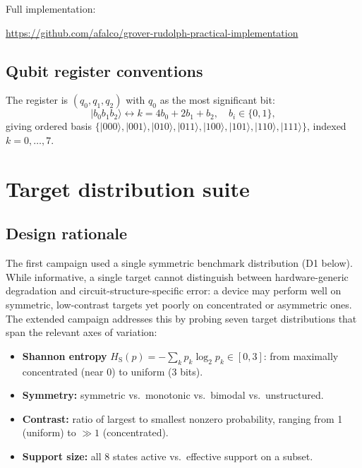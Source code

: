 \documentclass[11pt,a4paper]{article}
\renewcommand{\ket}[1]{|#1\rangle}
\newcommand{\HS}{H_{\mathrm{S}}}
\begin{document}
\noindent Full implementation:
\begin{center}
  \url{https://github.com/afalco/grover-rudolph-practical-implementation}
\end{center}

\subsection{Qubit register conventions}

The register is $(q_0, q_1, q_2)$ with $q_0$ as the most significant
bit:
\[
  \ket{b_0 b_1 b_2} \leftrightarrow k = 4b_0 + 2b_1 + b_2,
  \quad b_i \in \{0,1\},
\]
giving ordered basis
$\{\ket{000}, \ket{001}, \ket{010}, \ket{011},
   \ket{100}, \ket{101}, \ket{110}, \ket{111}\}$,
indexed $k=0,\ldots,7$.

\section{Target distribution suite}
\label{sec:distributions}

\subsection{Design rationale}

The first campaign used a single symmetric
benchmark distribution (D1 below). While informative, a single
target cannot distinguish between hardware-generic degradation and
circuit-structure-specific error: a device may perform well on
symmetric, low-contrast targets yet poorly on concentrated or
asymmetric ones. The extended campaign addresses this by probing
seven target distributions that span the relevant axes of variation:

\begin{itemize}
  \item \textbf{Shannon entropy} $\HS(p) = -\sum_k p_k \log_2 p_k \in [0, 3]$:
    from maximally concentrated (near 0) to uniform (3 bits).
  \item \textbf{Symmetry:} symmetric vs.\ monotonic vs.\ bimodal
    vs.\ unstructured.
  \item \textbf{Contrast:} ratio of largest to smallest
    nonzero probability, ranging from 1 (uniform) to $\gg 1$ (concentrated).
  \item \textbf{Support size:} all 8 states active vs.\ effective
    support on a subset.
\end{itemize}
\end{document}
